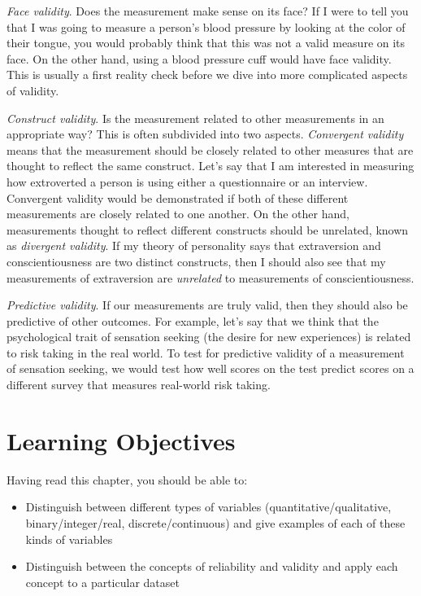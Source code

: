 \documentclass[12pt,]{book}
\providecommand{\tightlist}{%
  \setlength{\itemsep}{0pt}\setlength{\parskip}{0pt}}
\theoremstyle{definition}
\theoremstyle{definition}
\theoremstyle{definition}
\theoremstyle{remark}
\begin{document}
\emph{Face validity}. Does the measurement make sense on its face? If I were to tell you that I was going to measure a person's blood pressure by looking at the color of their tongue, you would probably think that this was not a valid measure on its face. On the other hand, using a blood pressure cuff would have face validity. This is usually a first reality check before we dive into more complicated aspects of validity.

\emph{Construct validity}. Is the measurement related to other measurements in an appropriate way? This is often subdivided into two aspects. \emph{Convergent validity} means that the measurement should be closely related to other measures that are thought to reflect the same construct. Let's say that I am interested in measuring how extroverted a person is using either a questionnaire or an interview. Convergent validity would be demonstrated if both of these different measurements are closely related to one another. On the other hand, measurements thought to reflect different constructs should be unrelated, known as \emph{divergent validity}. If my theory of personality says that extraversion and conscientiousness are two distinct constructs, then I should also see that my measurements of extraversion are \emph{unrelated} to measurements of conscientiousness.

\emph{Predictive validity}. If our measurements are truly valid, then they should also be predictive of other outcomes. For example, let's say that we think that the psychological trait of sensation seeking (the desire for new experiences) is related to risk taking in the real world. To test for predictive validity of a measurement of sensation seeking, we would test how well scores on the test predict scores on a different survey that measures real-world risk taking.

\hypertarget{learning-objectives-1}{%
\section{Learning Objectives}\label{learning-objectives-1}}

Having read this chapter, you should be able to:

\begin{itemize}
\tightlist
\item
  Distinguish between different types of variables (quantitative/qualitative, binary/integer/real, discrete/continuous) and give examples of each of these kinds of variables
\item
  Distinguish between the concepts of reliability and validity and apply each concept to a particular dataset
\end{itemize}
\end{document}
